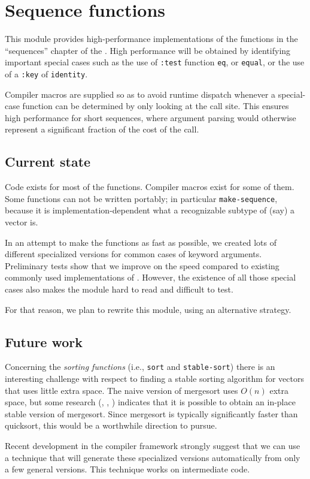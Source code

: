 \chapter{Sequence functions}

This module provides high-performance implementations of the
functions in the ``sequences'' chapter of the \hs{}.  High
performance will be obtained by identifying important special cases
such as the use of \texttt{:test} function \texttt{eq}, or
\texttt{equal}, or the use of a \texttt{:key} of \texttt{identity}. 

Compiler macros are supplied so as to avoid runtime dispatch
whenever a special-case function can be determined by only looking at
the call site.  This ensures high performance for short sequences,
where argument parsing would otherwise represent a significant
fraction of the cost of the call.

\section{Current state}

Code exists for most of the functions.  Compiler macros exist for some
of them.  Some functions can not be written portably; in particular
\texttt{make-sequence}, because it is implementation-dependent what a
recognizable subtype of (say) a vector is.

In an attempt to make the functions as fast as possible, we created
lots of different specialized versions for common cases of keyword
arguments.  Preliminary tests show that we improve on the speed
compared to existing commonly used implementations of \commonlisp{}.  However,
the existence of all those special cases also makes the module hard to
read and difficult to test.  

For that reason, we plan to rewrite this module, using an alternative
strategy. 


\section{Future work}
\label{sec-sequence-functions-future-work}

Concerning the \emph{sorting functions} (i.e., \texttt{sort} and
\texttt{stable-sort}) there is an interesting challenge with respect
to finding a stable sorting algorithm for vectors that uses little
extra space.  The naive version of mergesort uses $O(n)$ extra space,
but some research (\cite{Huang:1990:FSM:898863},
\cite{Huang:1988:PIM:42392.42403},
\cite{Katajainen:1996:PIM:642136.642138}) indicates that it is
possible to obtain an in-place stable version of mergesort.   Since
mergesort is typically significantly faster than quicksort, this would
be a worthwhile direction to pursue.

Recent development in the \cleavir{} compiler framework
strongly suggest that we can use a technique that will generate these
specialized versions automatically from only a few general versions.
This technique works on intermediate code.
